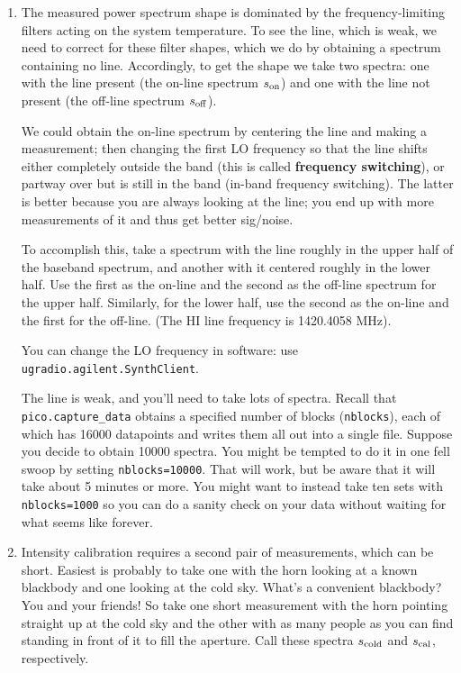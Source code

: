 \documentclass[11pt,preprint]{aastex}
\begin{document}
\begin{enumerate}

\item 
The measured power spectrum shape is dominated by the
frequency-limiting filters acting on the system temperature. To see the
line, which is weak, we need to correct for these filter shapes, which
we do by obtaining a spectrum containing no line. Accordingly, to get
the shape we take two spectra: one with the line present (the on-line
spectrum $s_{\rm on}$) and one with the line not present (the off-line
spectrum $s_{\rm off}$).

We could obtain the on-line
  spectrum by centering the line and making a measurement; then changing
  the first LO frequency so that the line shifts either completely
  outside the band (this is called {\bf frequency switching}), or partway
  over but is still in the band (in-band frequency
  switching). The latter is better because you are always looking at
  the line; you end up with more measurements of it and thus get better sig/noise.

To accomplish this, take a spectrum with the line roughly in the upper
half of the baseband spectrum, and another with it centered roughly in
the lower half. Use the first as the on-line and the second as the
off-line spectrum for the upper half. Similarly, for the lower half,
use the second as the on-line and the first for the off-line.  (The HI
line frequency is 1420.4058 MHz).

You can change the LO frequency in software: use {\tt ugradio.agilent.SynthClient}. 

The line is weak, and you'll need to take lots of spectra. Recall that
{\tt pico.capture\_data} obtains a specified number of blocks ({\tt nblocks}),
each of which has 16000 datapoints and writes them all out into a single
file. Suppose you decide to obtain 10000 spectra. You might be tempted
to do it in one fell swoop by setting {\tt nblocks=10000}. That
will work, but be aware that it will take about 5 minutes or more. You
might want to instead take ten sets with {\tt nblocks=1000} so you can do a
sanity check on your data without waiting for what seems like forever. 

\item Intensity calibration requires a second pair of measurements,
  which can be short. Easiest is probably to take one with the horn
  looking at a known blackbody and one looking at the cold sky. What's a
  convenient blackbody? You and your friends! So take one short
  measurement with the horn pointing straight up at the cold sky and the
  other with as many people as you can find standing in front of it to
  fill the aperture. Call these spectra
  $s_{\rm cold}$ and $s_{\rm cal}$, respectively.

\end{enumerate}
\end{document}
